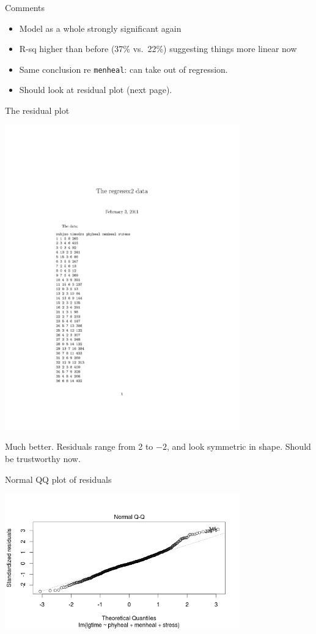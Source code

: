 \begin{frame}[fragile]{Comments}

  \begin{itemize}
  \item Model as a whole strongly significant again 
  \item R-sq higher than before (37\% vs.\ 22\%) suggesting things more linear now
  \item Same conclusion re \verb-menheal-: can take out of regression.
  \item Should look at residual plot (next page).
  \end{itemize}
  
\end{frame}

\begin{frame}[fragile]{The residual plot}

\includegraphics[width=4in]{regressx2}

Much better. Residuals range from 2 to $-2$, and look symmetric in shape. Should be trustworthy now.
  
\end{frame}

\begin{frame}[fragile]{Normal QQ plot of residuals}

\includegraphics[width=4in]{regressx2a}

  
\end{frame}

